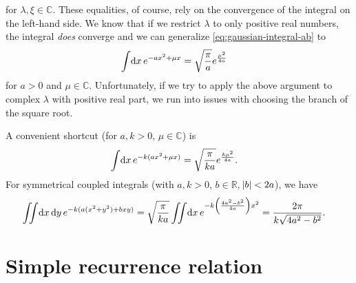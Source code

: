 for $\lambda, \xi \in \mathbb{C}$.
These equalities, of course, rely on the convergence of the integral on the left-hand side.
We know that if we restrict $\lambda$ to only positive real numbers, the integral \emph{does} converge and we can generalize \cref{eq:gaussian-integral-ab} to
\begin{align}
	\int\! \dif x \, e^{-a x^2 + \mu x}
	&= \sqrt{\frac{\pi}{a}} e^{\frac{\mu^2}{4 a}}
		\label{eq:gaussian-integral-amu}
\end{align}
for $a > 0$ and $\mu \in \mathbb{C}$.
Unfortunately, if we try to apply the above argument to complex $\lambda$ with positive real part, we run into issues with choosing the branch of the square root.

A convenient shortcut (for $a, k > 0$, $\mu \in \mathbb{C}$) is
\begin{align}
	\int\! \dif x \, e^{-k (a x^2 + \mu x)}
	&= \sqrt{\frac{\pi}{k a}} e^{\frac{k \mu^2}{4 a}}.
		\label{eq:gaussian-integral-kamu}
\end{align}
For symmetrical coupled integrals (with $a, k > 0$, $b \in \mathbb{R}$, $\abs{b} < 2 a$), we have
\begin{align}
	\iint\! \dif x \dif y \, e^{-k (a (x^2 + y^2) + b x y)}
	&= \sqrt{\frac{\pi}{k a}}
		\iint\! \dif x \, e^{-k \left( \frac{4 a^2 - b^2}{4 a} \right) x^2}
	= \frac{2 \pi}{k \sqrt{4 a^2 - b^2}}.
		\label{eq:gaussian-integral-coupled}
\end{align}


\section{Simple recurrence relation}

